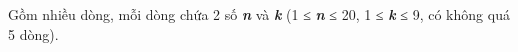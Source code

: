 Gồm nhiều dòng, mỗi dòng chứa 2 số   \textbf{\emph{     n    }}   và   \textbf{\emph{     k    }}   (1 ≤   \textbf{\emph{     n    }}   ≤ 20, 1 ≤   \textbf{\emph{     k    }}   ≤ 9, có không quá 5 dòng).